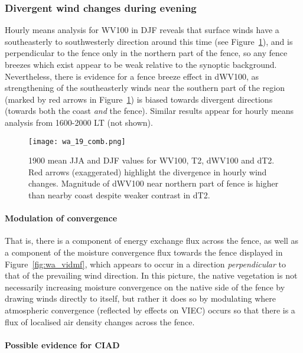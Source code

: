 \subsubsection{Divergent wind changes during evening}

Hourly means analysis for \ac{WV100} in \ac{DJF} reveals that surface winds have a southeasterly to southwesterly direction around this time (see Figure~\ref{fig:wa_19_comb}), and is perpendicular to the fence only in the northern part of the fence, so any fence breezes which exist appear to be weak relative to the synoptic background. Nevertheless, there is evidence for a fence breeze effect in \ac{dWV100}, as strengthening of the southeasterly winds near the southern part of the region (marked by red arrows in Figure~\ref{fig:wa_19_comb}) is biased towards divergent directions (towards both the coast \textit{and} the fence). Similar results appear for hourly means analysis from 1600-2000 \ac{LT} (not shown).

\begin{figure}[!htp]
	\centering
	\texttt{[image: wa\_19\_comb.png]}
	\caption[Divergent wind changes during evening]{1900 mean \ac{JJA} and \ac{DJF} values for \acs{WV100}, \acs{T2}, \acs{dWV100} and \acs{dT2}. Red arrows (exaggerated) highlight the divergence in hourly wind changes. Magnitude of \ac{dWV100} near northern part of fence is higher than nearby coast despite weaker contrast in \ac{dT2}.}
	\label{fig:wa_19_comb}
\end{figure}

\paragraph{Modulation of convergence}

That is, there is a component of energy exchange flux across the fence, as well as a component of the moisture convergence flux towards the fence displayed in Figure~\ref{fig:wa_vidmf}, which appears to occur in a direction \textit{perpendicular} to that of the prevailing wind direction. In this picture, the native vegetation is not necessarily increasing moisture convergence on the native side of the fence by drawing winds directly to itself, but rather it does so by modulating where atmospheric convergence (reflected by effects on \ac{VIEC}) occurs so that there is a flux of localised air density changes across the fence.

\paragraph{Possible evidence for CIAD}


